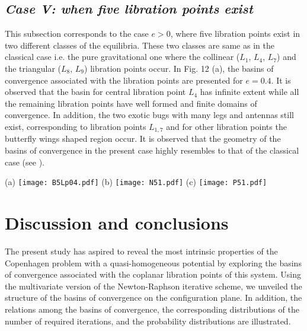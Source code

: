 \documentclass[preprint,fleqn,5p,numbers,sort&compress]{elsarticle}
\begin{document}
\subsection{\emph{Case V: when five libration points exist}}
\label{sec:405}
This subsection corresponds to the case $e > 0$, where five libration points exist in two different classes of the equilibria. These two classes are same as in the classical case i.e. the pure gravitational one where the collinear ($L_1$, $L_4$, $L_7$) and the triangular ($L_8$, $L_9$) libration points occur. In Fig. \textcolor[rgb]{1.00,0.00,0.50}{12} (a), the basins of convergence associated with the libration points are presented for $e=0.4$. It is observed that the basin for central libration point $L_4$ has infinite extent while all the remaining libration points have well formed and finite domains of convergence. In addition, the two exotic bugs with many legs and antennas still exist, corresponding to libration points $L_{1,7}$ and for other libration points the butterfly wings shaped region occur. It is observed that the geometry of the basins of convergence in the present case highly resembles to that of the classical case (see \cite{zot15}).
\begin{figure*}\label{Fig:13}
\begin{center}
(a) \texttt{[image: B5Lp04.pdf]}%
(b) \texttt{[image: N51.pdf]}
(c) \texttt{[image: P51.pdf]}
\caption{The Newton-Raphson basins of attraction on the $(x,y)$ plane for the case when five libration points exist for:  (a) $e=0.4$. The color code denoting the attractors is as in previous figures.  (b: the middle panel)
  The corresponding
  distribution of the number $N$ of required iterations for obtaining the attracting
  regions, (c: the right panel) the corresponding probability distributions of required number of iterations
  for obtaining the Newton-Raphson basins of convergence, shown in panel (a). The vertical, dashed, red line indicates the most probable number $N^*$ of iterations.}
\end{center}
\end{figure*}
\section{Discussion and conclusions}
\label{sec:5}
The present study has aspired to reveal the most intrinsic properties of the Copenhagen problem with a quasi-homogeneous potential by exploring the basins of convergence associated with the coplanar libration points of this system.  Using the multivariate version of the Newton-Raphson iterative scheme, we unveiled the structure of the basins of convergence on the configuration plane. In addition, the relations among the basins of convergence, the corresponding distributions of the number of required iterations, and the probability distributions are illustrated.
\end{document}
